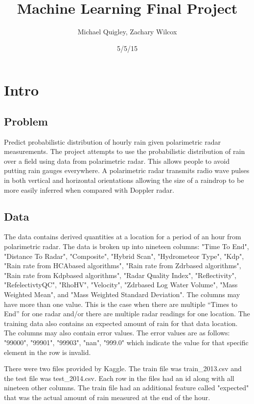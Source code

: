 ﻿\documentclass[pdftex,a4paper,12pt]{article}
\title{Machine Learning Final Project}
\author{Michael Quigley, Zachary Wilcox}
\date{5/5/15}
\begin{document}
\maketitle
\section{Intro}
\subsection{Problem}
Predict probabilistic distribution of hourly rain given polarimetric radar measurements.
The project attempts to use the probabilistic distribution of rain over a field using data from
polarimetric radar. This allows people to avoid putting rain gauges everywhere. A polarimetric
radar transmits radio wave pulses in both vertical and horizontal orientations allowing the size
of a raindrop to be more easily inferred when compared with Doppler radar.
\subsection{Data}
The data contains derived quantities at a location for a period of an hour from polarimetric
radar. The data is broken up into nineteen columns: "Time To End", "Distance To Radar",
"Composite", "Hybrid Scan", "Hydrometeor Type", "Kdp", "Rain rate from HCAbased
algorithms", "Rain rate from Zdrbased
algorithms", "Rain rate from Kdpbased
algorithms",
"Radar Quality Index", "Reflectivity", "RefelectivtyQC", "RhoHV", "Velocity", "Zdrbased
Log
Water Volume", "Mass Weighted Mean", and "Mass Weighted Standard Deviation".
The columns may have more than one value. This is the case when there are multiple “Times
to End” for one radar and/or there are multiple radar readings for one location. The training
data also contains an expected amount of rain for that data location. The columns may also
contain error values. The error values are as follows: "99000",
"99901",
"99903",
"nan",
"999.0" which indicate the value for that specific element in the row is invalid.




There were two files provided by Kaggle. The train file was train\_2013.csv and the test file was test\_2014.csv. Each row in the files had an id along with all nineteen other columns. The train file had an additional feature called "expected" that was the actual amount of rain measured at the end of the hour.
\end{document}
